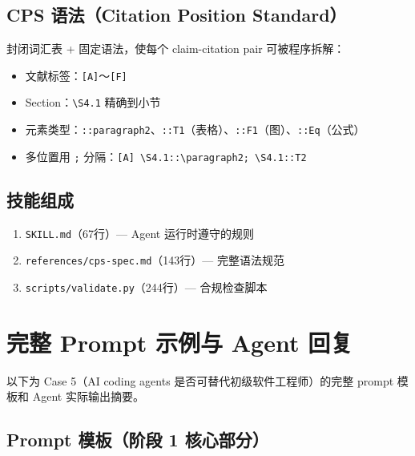 \documentclass[UTF8,fontset=fandol,a4paper,12pt]{ctexart}
\begin{document}
\subsection{CPS 语法（Citation Position Standard）}

封闭词汇表 + 固定语法，使每个 claim-citation pair 可被程序拆解：

\begin{itemize}[nosep]
  \item 文献标签：\texttt{[A]}～\texttt{[F]}
  \item Section：\texttt{\textbackslash S4.1} 精确到小节
  \item 元素类型：\texttt{::paragraph2}、\texttt{::T1}（表格）、\texttt{::F1}（图）、\texttt{::Eq}（公式）
  \item 多位置用 \texttt{;} 分隔：\texttt{[A] \textbackslash S4.1::\textbackslash paragraph2; \textbackslash S4.1::T2}
\end{itemize}

\subsection{技能组成}

\begin{enumerate}[nosep]
  \item \texttt{SKILL.md}（67行）— Agent 运行时遵守的规则
  \item \texttt{references/cps-spec.md}（143行）— 完整语法规范
  \item \texttt{scripts/validate.py}（244行）— 合规检查脚本
\end{enumerate}

\section{完整 Prompt 示例与 Agent 回复}

以下为 Case 5（AI coding agents 是否可替代初级软件工程师）的完整 prompt 模板和 Agent 实际输出摘要。

\subsection{Prompt 模板（阶段 1 核心部分）}
\end{document}

